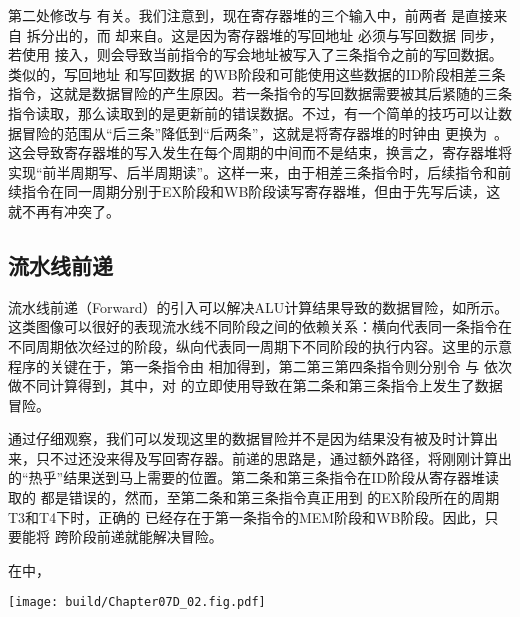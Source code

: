 第二处修改与 有关。我们注意到，现在寄存器堆的三个输入中，前两者 是直接来自 拆分出的，而 却来自。这是因为寄存器堆的写回地址 必须与写回数据 同步，若使用 接入，则会导致当前指令的写会地址被写入了三条指令之前的写回数据。类似的，写回地址 和写回数据 的WB阶段和可能使用这些数据的ID阶段相差三条指令，这就是数据冒险的产生原因。若一条指令的写回数据需要被其后紧随的三条指令读取，那么读取到的是更新前的错误数据。不过，有一个简单的技巧可以让数据冒险的范围从“后三条”降低到“后两条”，这就是将寄存器堆的时钟由 更换为\ \texttt{}。这会导致寄存器堆的写入发生在每个周期的中间而不是结束，换言之，寄存器堆将实现“前半周期写、后半周期读”。这样一来，由于相差三条指令时，后续指令和前续指令在同一周期分别于EX阶段和WB阶段读写寄存器堆，但由于先写后读，这就不再有冲突了。


\subsection{流水线前递}
流水线前递（Forward）的引入可以解决ALU计算结果导致的数据冒险，如所示。这类图像可以很好的表现流水线不同阶段之间的依赖关系：横向代表同一条指令在不同周期依次经过的阶段，纵向代表同一周期下不同阶段的执行内容。这里的示意程序的关键在于，第一条指令由 相加得到，第二第三第四条指令则分别令 与 依次做不同计算得到，其中，对 的立即使用导致在第二条和第三条指令上发生了数据冒险。

通过仔细观察，我们可以发现这里的数据冒险并不是因为结果没有被及时计算出来，只不过还没来得及写回寄存器。前递的思路是，通过额外路径，将刚刚计算出的“热乎”结果送到马上需要的位置。第二条和第三条指令在ID阶段从寄存器堆读取的 都是错误的，然而，至第二条和第三条指令真正用到 的EX阶段所在的周期T3和T4下时，正确的 已经存在于第一条指令的MEM阶段和WB阶段。因此，只要能将 跨阶段前递就能解决冒险。

在中，

\begin{Figure}[流水线前递]
    \texttt{[image: build/Chapter07D\_02.fig.pdf]}
\end{Figure}